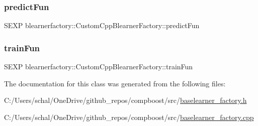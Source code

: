 \subsubsection{\texorpdfstring{predict\+Fun}{predictFun}}
{\footnotesize\ttfamily S\+E\+XP blearnerfactory\+::\+Custom\+Cpp\+Blearner\+Factory\+::predict\+Fun\hspace{0.3cm}{\ttfamily [private]}}

\mbox{\label{classblearnerfactory_1_1_custom_cpp_blearner_factory_aad89a4d126b8b3e5ac0b6bca98074193}} 
\subsubsection{\texorpdfstring{train\+Fun}{trainFun}}
{\footnotesize\ttfamily S\+E\+XP blearnerfactory\+::\+Custom\+Cpp\+Blearner\+Factory\+::train\+Fun\hspace{0.3cm}{\ttfamily [private]}}



The documentation for this class was generated from the following files\+:\begin{DoxyCompactItemize}
\item 
C\+:/\+Users/schal/\+One\+Drive/github\+\_\+repos/compboost/src/\mbox{\hyperlink{baselearner__factory_8h}{baselearner\+\_\+factory.\+h}}\item 
C\+:/\+Users/schal/\+One\+Drive/github\+\_\+repos/compboost/src/\mbox{\hyperlink{baselearner__factory_8cpp}{baselearner\+\_\+factory.\+cpp}}\end{DoxyCompactItemize}
